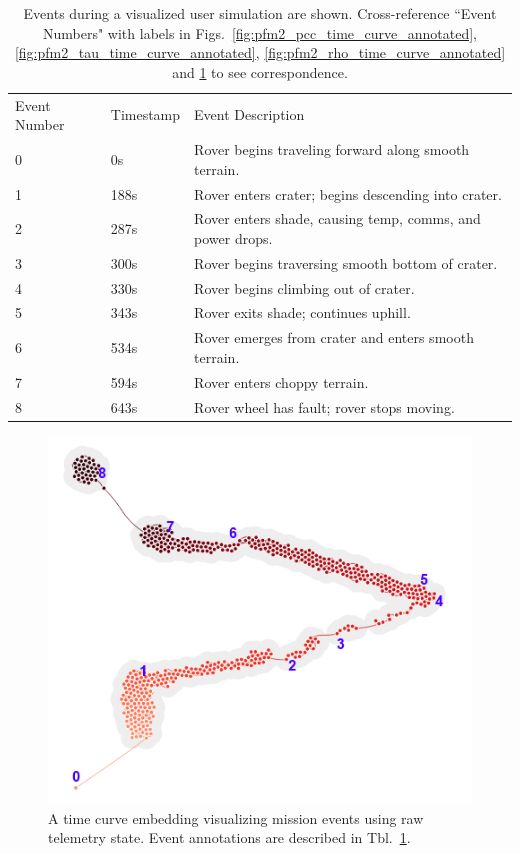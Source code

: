 \begin{table}[]
\centering
\begin{tabular}{lll}
Event Number & Timestamp & Event Description \\
0 & 0s & Rover begins traveling forward along smooth terrain. \\
1 & 188s & Rover enters crater; begins descending into crater. \\
2 & 287s & Rover enters shade, causing temp, comms, and power drops. \\
3 & 300s & Rover begins traversing smooth bottom of crater. \\
4 & 330s & Rover begins climbing out of crater. \\
5 & 343s & Rover exits shade; continues uphill. \\
6 & 534s & Rover emerges from crater and enters smooth terrain. \\
7 & 594s & Rover enters choppy terrain. \\
8 & 643s & Rover wheel has fault; rover stops moving.
\end{tabular}
\caption{Events during a visualized user simulation are shown. Cross-reference ``Event Numbers" with labels in Figs.~\ref{fig:pfm2_pcc_time_curve_annotated}, \ref{fig:pfm2_tau_time_curve_annotated}, \ref{fig:pfm2_rho_time_curve_annotated} and \ref{fig:pfm2_raw_data_time_curve_annotated} to see correspondence.}
\label{tbl:events}
\end{table}

\begin{figure}[h]
\centering
    \includegraphics{images/pfm2_raw_data_time_curve_annotated.png}
    \caption{A time curve embedding visualizing mission events using raw telemetry state. Event annotations are described in Tbl.~\ref{tbl:events}.}
    \label{fig:pfm2_raw_data_time_curve_annotated}
\end{figure}

